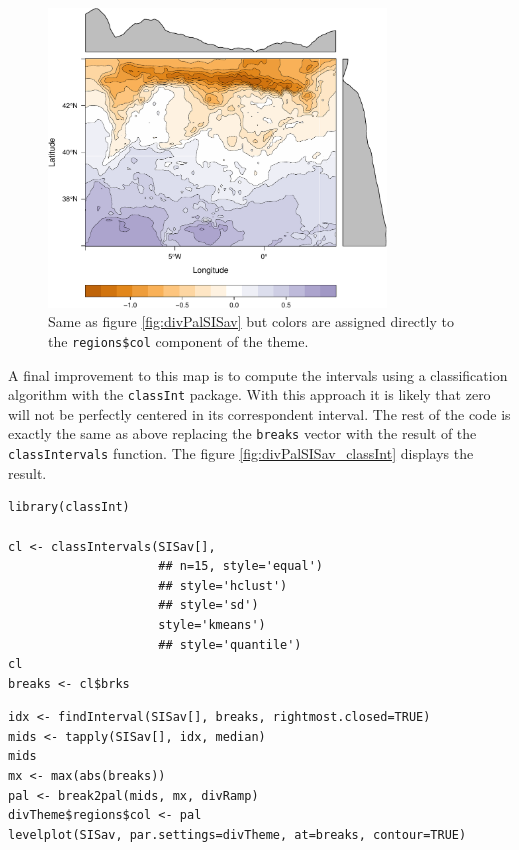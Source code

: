 \begin{figure}[h!]
\centering
\includegraphics[width=0.8\textwidth]{figs/divPalSISav_regions.pdf}
\caption{\label{fig:divPal_SISav_regions}Same as figure \ref{fig:divPalSISav} but colors are assigned directly to the \texttt{regions\$col} component of the theme.}
\end{figure}

A final improvement to this map is to compute the intervals using
a classification algorithm with the \texttt{classInt} package. With this
approach it is likely that zero will not be perfectly centered in
its correspondent interval. The rest of the code is exactly the
same as above replacing the \texttt{breaks} vector with the result of the
\texttt{classIntervals} function. The figure
\ref{fig:divPalSISav_classInt} displays the result.


\lstset{language=R}
\begin{lstlisting}
library(classInt)

cl <- classIntervals(SISav[],
                     ## n=15, style='equal')
                     ## style='hclust')
                     ## style='sd')
                     style='kmeans')
                     ## style='quantile')
cl
breaks <- cl$brks
\end{lstlisting}


\lstset{language=R}
\begin{lstlisting}
idx <- findInterval(SISav[], breaks, rightmost.closed=TRUE)
mids <- tapply(SISav[], idx, median)
mids
mx <- max(abs(breaks))
pal <- break2pal(mids, mx, divRamp)
divTheme$regions$col <- pal
levelplot(SISav, par.settings=divTheme, at=breaks, contour=TRUE)
\end{lstlisting}

